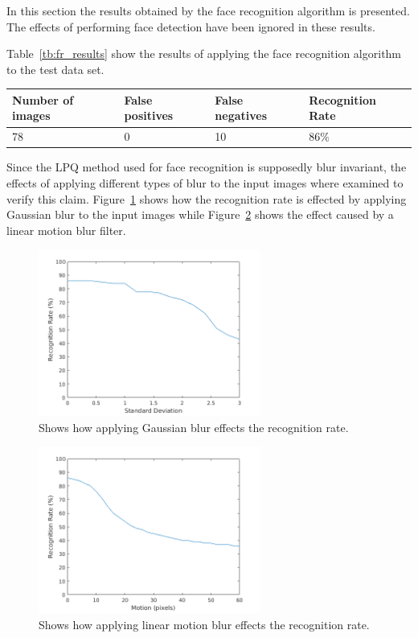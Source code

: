 In this section the results obtained by the face recognition algorithm is  presented. The effects of performing face detection have been ignored in these results.

Table~\ref{tb:fr_results} show the results of applying the face recognition algorithm to the test data set.

\begin{center}
  \label{tb:fr_results}
    \begin{tabular}{ | l | l | l | l |}
    \hline
    Number of images & False positives & False negatives & Recognition Rate \\ \hline
    78 & 0 & 10 & 86\% \\ \hline
    \end{tabular}
\end{center}

Since the LPQ method used for face recognition is supposedly blur invariant, the effects of applying different types of blur to the input images where examined to verify this claim. Figure~\ref{fig:fr_result_plots_gauss} shows how the recognition rate is effected by applying Gaussian blur to the input images while Figure~\ref{fig:fr_result_plots_motion} shows the effect caused by a linear motion blur filter.

\begin{figure}[H]
\centering
\includegraphics[width=0.65\textwidth]{img/blur_test/gauss_plot.png}
\caption{Shows how applying Gaussian blur effects the recognition rate.}
\label{fig:fr_result_plots_gauss}
\end{figure}

\begin{figure}[H]
\centering
\includegraphics[width=0.65\textwidth]{img/blur_test/motion_plot.png}
\caption{Shows how applying linear motion blur effects the recognition rate.}
\label{fig:fr_result_plots_motion}
\end{figure}
